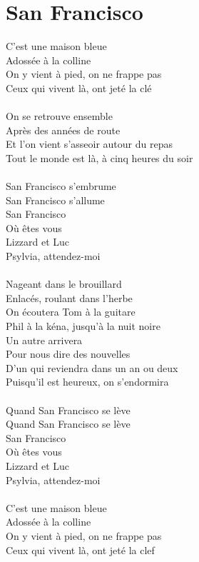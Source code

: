 \section*{San Francisco}
C'est une maison bleue\\
Adossée à la colline\\
On y vient à pied, on ne frappe pas\\
Ceux qui vivent là, ont jeté la clé\\\\
On se retrouve ensemble\\
Après des années de route\\
Et l'on vient s'asseoir autour du repas\\
Tout le monde est là, à cinq heures du soir\\\\
San Francisco s'embrume\\
San Francisco s'allume\\
San Francisco\\
Où êtes vous\\
Lizzard et Luc\\
Psylvia, attendez-moi\\\\
Nageant dans le brouillard\\
Enlacés, roulant dans l'herbe\\
On écoutera Tom à la guitare\\
Phil à la kéna, jusqu'à la nuit noire\\
Un autre arrivera\\
Pour nous dire des nouvelles\\
D'un qui reviendra dans un an ou deux\\
Puisqu'il est heureux, on s'endormira\\\\
Quand San Francisco se lève\\
Quand San Francisco se lève\\
San Francisco\\
Où êtes vous\\
Lizzard et Luc\\
Psylvia, attendez-moi\\\\
C'est une maison bleue\\
Adossée à la colline\\
On y vient à pied, on ne frappe pas\\
Ceux qui vivent là, ont jeté la clef\\\\
